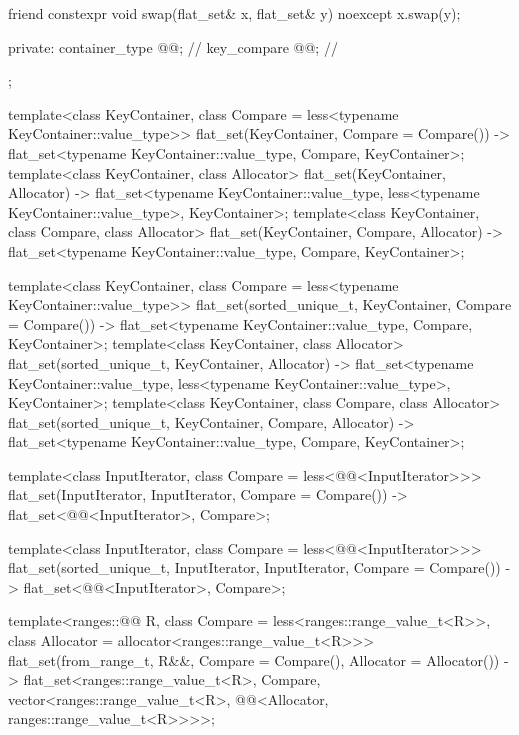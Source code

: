 \begin{codeblock}
{{    friend constexpr void swap(flat_set& x, flat_set& y) noexcept { x.swap(y); }

  private:
    container_type @@;           // \expos
    key_compare @@;        // \expos
  };

  template<class KeyContainer, class Compare = less<typename KeyContainer::value_type>>
    flat_set(KeyContainer, Compare = Compare())
      -> flat_set<typename KeyContainer::value_type, Compare, KeyContainer>;
  template<class KeyContainer, class Allocator>
    flat_set(KeyContainer, Allocator)
      -> flat_set<typename KeyContainer::value_type,
                  less<typename KeyContainer::value_type>, KeyContainer>;
  template<class KeyContainer, class Compare, class Allocator>
    flat_set(KeyContainer, Compare, Allocator)
      -> flat_set<typename KeyContainer::value_type, Compare, KeyContainer>;

  template<class KeyContainer, class Compare = less<typename KeyContainer::value_type>>
    flat_set(sorted_unique_t, KeyContainer, Compare = Compare())
      -> flat_set<typename KeyContainer::value_type, Compare, KeyContainer>;
  template<class KeyContainer, class Allocator>
    flat_set(sorted_unique_t, KeyContainer, Allocator)
      -> flat_set<typename KeyContainer::value_type,
                  less<typename KeyContainer::value_type>, KeyContainer>;
  template<class KeyContainer, class Compare, class Allocator>
    flat_set(sorted_unique_t, KeyContainer, Compare, Allocator)
      -> flat_set<typename KeyContainer::value_type, Compare, KeyContainer>;

  template<class InputIterator, class Compare = less<@@<InputIterator>>>
    flat_set(InputIterator, InputIterator, Compare = Compare())
      -> flat_set<@@<InputIterator>, Compare>;

  template<class InputIterator, class Compare = less<@@<InputIterator>>>
    flat_set(sorted_unique_t, InputIterator, InputIterator, Compare = Compare())
      -> flat_set<@@<InputIterator>, Compare>;

  template<ranges::@@ R, class Compare = less<ranges::range_value_t<R>>,
           class Allocator = allocator<ranges::range_value_t<R>>>
    flat_set(from_range_t, R&&, Compare = Compare(), Allocator = Allocator())
      -> flat_set<ranges::range_value_t<R>, Compare,
                  vector<ranges::range_value_t<R>,
                         @@<Allocator, ranges::range_value_t<R>>>>;

}
\end{codeblock}
